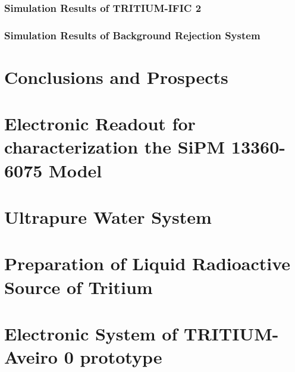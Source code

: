 \documentclass[12pt,a4paper]{book}
\begin{document}
		\subsection[Simulation Results of TRITIUM-IFIC 2]{Simulation Results of TRITIUM-IFIC 2}\label{subsec:ResultsSimulatedTRITIUMIFIC2}
		
		
		\subsection[Simulation Results of Background Rejection System]{Simulation Results of Background Rejection System}\label{subsec:ResultsSimulatedBackgroundRejectionSystem}
		
		\newpage

\chapter{Conclusions and Prospects}  \label{chap:Conclusions}



\appendix
\appendixpage
\noappendicestocpagenum
\addappheadtotoc

\chapter{Electronic Readout for characterization the SiPM 13360-6075 Model}\label{App:ElectronicReadoutSiPM}


\chapter{Ultrapure Water System}\label{App:UltraPureWaterSystem}


\chapter{Preparation of Liquid Radioactive Source of Tritium}\label{App:TritiumSourcePreparation}


\chapter{Electronic System of TRITIUM-Aveiro 0 prototype}\label{App:ElectronicSystemAveiro}

\end{document}

